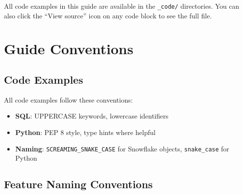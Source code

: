 \documentclass[
  letterpaper,
  DIV=11,
  numbers=noendperiod]{scrreprt}
\providecommand{\tightlist}{%
  \setlength{\itemsep}{0pt}\setlength{\parskip}{0pt}}\usepackage{longtable,booktabs,array}
\begin{document}
\begin{tcolorbox}[enhanced jigsaw, title=\textcolor{quarto-callout-tip-color}{\faLightbulb}\hspace{0.5em}{Full Code Available}, colbacktitle=quarto-callout-tip-color!10!white, rightrule=.15mm, arc=.35mm, colframe=quarto-callout-tip-color-frame, left=2mm, bottomtitle=1mm, toptitle=1mm, breakable, bottomrule=.15mm, opacityback=0, titlerule=0mm, toprule=.15mm, opacitybacktitle=0.6, colback=white, coltitle=black, leftrule=.75mm]

All code examples in this guide are available in the \texttt{\_code/}
directories. You can also click the ``View source'' icon on any code
block to see the full file.

\end{tcolorbox}

\hypertarget{guide-conventions}{%
\section{Guide Conventions}\label{guide-conventions}}

\hypertarget{code-examples-1}{%
\subsection{Code Examples}\label{code-examples-1}}

All code examples follow these conventions:

\begin{itemize}
\tightlist
\item
  \textbf{SQL}: UPPERCASE keywords, lowercase identifiers
\item
  \textbf{Python}: PEP 8 style, type hints where helpful
\item
  \textbf{Naming}: \texttt{SCREAMING\_SNAKE\_CASE} for Snowflake
  objects, \texttt{snake\_case} for Python
\end{itemize}

\hypertarget{sec-naming-conventions}{%
\subsection{Feature Naming Conventions}\label{sec-naming-conventions}}
\end{document}
